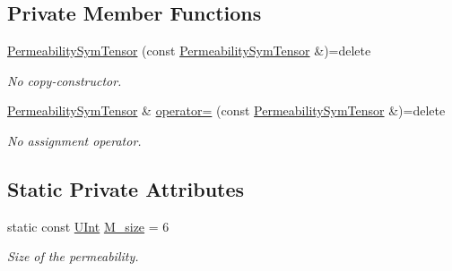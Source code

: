 \subsection*{Private Member Functions}
\begin{DoxyCompactItemize}
\item 
\hyperlink{classFVCode3D_1_1PermeabilitySymTensor_ae8d0ae7cda07b4d75cfcf544a2521de6}{Permeability\+Sym\+Tensor} (const \hyperlink{classFVCode3D_1_1PermeabilitySymTensor}{Permeability\+Sym\+Tensor} \&)=delete
\begin{DoxyCompactList}\small\item\em No copy-\/constructor. \end{DoxyCompactList}\item 
\hyperlink{classFVCode3D_1_1PermeabilitySymTensor}{Permeability\+Sym\+Tensor} \& \hyperlink{classFVCode3D_1_1PermeabilitySymTensor_aca220a25e1ddb35991df732c2d0e81e8}{operator=} (const \hyperlink{classFVCode3D_1_1PermeabilitySymTensor}{Permeability\+Sym\+Tensor} \&)=delete
\begin{DoxyCompactList}\small\item\em No assignment operator. \end{DoxyCompactList}\end{DoxyCompactItemize}
\subsection*{Static Private Attributes}
\begin{DoxyCompactItemize}
\item 
static const \hyperlink{namespaceFVCode3D_a4bf7e328c75d0fd504050d040ebe9eda}{U\+Int} \hyperlink{classFVCode3D_1_1PermeabilitySymTensor_a611205289ba216ec4505dd76a284dd9b}{M\+\_\+size} = 6
\begin{DoxyCompactList}\small\item\em Size of the permeability. \end{DoxyCompactList}\end{DoxyCompactItemize}
